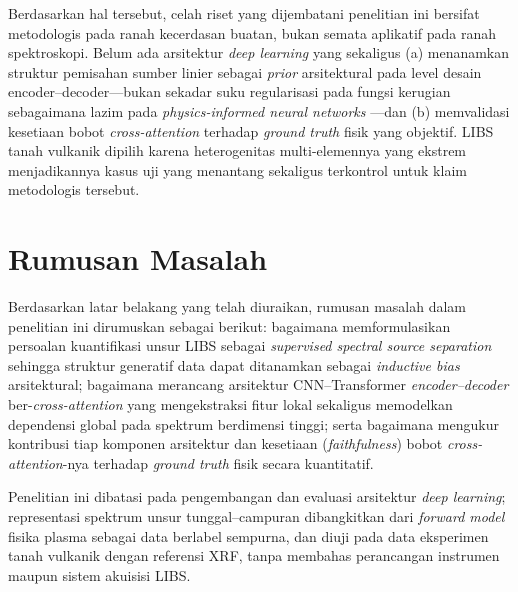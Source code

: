 Berdasarkan hal tersebut, celah riset yang dijembatani penelitian ini bersifat metodologis pada ranah kecerdasan buatan, bukan semata aplikatif pada ranah spektroskopi. Belum ada arsitektur \textit{deep learning} yang sekaligus (a) menanamkan struktur pemisahan sumber linier sebagai \textit{prior} arsitektural pada level desain encoder--decoder---bukan sekadar suku regularisasi pada fungsi kerugian sebagaimana lazim pada \textit{physics-informed neural networks} \citep{karniadakis_physics-informed_2021, raissi_physics-informed_2019}---dan (b) memvalidasi kesetiaan bobot \textit{cross-attention} terhadap \textit{ground truth} fisik yang objektif. LIBS tanah vulkanik dipilih karena heterogenitas multi-elemennya yang ekstrem menjadikannya kasus uji yang menantang sekaligus terkontrol untuk klaim metodologis tersebut.

\section{Rumusan Masalah}
Berdasarkan latar belakang yang telah diuraikan, rumusan masalah dalam penelitian ini dirumuskan sebagai berikut: bagaimana memformulasikan persoalan kuantifikasi unsur LIBS sebagai \textit{supervised spectral source separation} sehingga struktur generatif data dapat ditanamkan sebagai \textit{inductive bias} arsitektural; bagaimana merancang arsitektur CNN--Transformer \textit{encoder--decoder} ber-\textit{cross-attention} yang mengekstraksi fitur lokal sekaligus memodelkan dependensi global pada spektrum berdimensi tinggi; serta bagaimana mengukur kontribusi tiap komponen arsitektur dan kesetiaan (\textit{faithfulness}) bobot \textit{cross-attention}-nya terhadap \textit{ground truth} fisik secara kuantitatif.

Penelitian ini dibatasi pada pengembangan dan evaluasi arsitektur \textit{deep learning}; representasi spektrum unsur tunggal--campuran dibangkitkan dari \textit{forward model} fisika plasma sebagai data berlabel sempurna, dan diuji pada data eksperimen tanah vulkanik dengan referensi XRF, tanpa membahas perancangan instrumen maupun sistem akuisisi LIBS.

